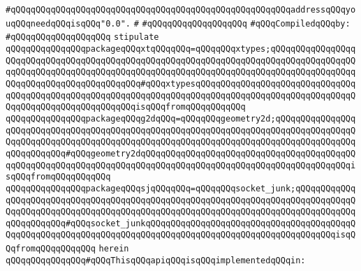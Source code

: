 \verb|#qQQqqQQqqQQqqQQqqQQqqQQqqQQqqQQqqQQqqQQqqQQqqQQqqQQqqQQqaddressqQQqyouqQQqneedqQQqisqQQq"0.0".|\newline
\verb|#|\newline
\verb|#qQQqqQQqqQQqqQQqqQQq|\newline
\newline
\verb|#qQQqCompiledqQQqby:|\newline
\verb|#qQQqqQQqqQQqqQQqqQQq|\newline
\newline
\newline
\newline
\verb|stipulate|\newline
\verb|qQQqqQQqqQQqqQQqpackageqQQqxtqQQqqQQq=qQQqqQQqxtypes;qQQqqQQqqQQqqQQqqQQqqQQqqQQqqQQqqQQqqQQqqQQqqQQqqQQqqQQqqQQqqQQqqQQqqQQqqQQqqQQqqQQqqQQqqQQqqQQqqQQqqQQqqQQqqQQqqQQqqQQqqQQqqQQqqQQqqQQqqQQqqQQqqQQqqQQqqQQqqQQqqQQqqQQqqQQqqQQqqQQqqQQq#qQQqxtypesqQQqqQQqqQQqqQQqqQQqqQQqqQQqqQQqqQQqqQQqqQQqqQQqqQQqqQQqqQQqqQQqqQQqqQQqqQQqqQQqqQQqqQQqqQQqqQQqqQQqqQQqqQQqqQQqqQQqqQQqqQQqqQQqisqQQqfromqQQqqQQqqQQq|\newline
\verb|qQQqqQQqqQQqqQQqpackageqQQqg2dqQQq=qQQqqQQqgeometry2d;qQQqqQQqqQQqqQQqqQQqqQQqqQQqqQQqqQQqqQQqqQQqqQQqqQQqqQQqqQQqqQQqqQQqqQQqqQQqqQQqqQQqqQQqqQQqqQQqqQQqqQQqqQQqqQQqqQQqqQQqqQQqqQQqqQQqqQQqqQQqqQQqqQQqqQQqqQQqqQQqqQQqqQQq#qQQqgeometry2dqQQqqQQqqQQqqQQqqQQqqQQqqQQqqQQqqQQqqQQqqQQqqQQqqQQqqQQqqQQqqQQqqQQqqQQqqQQqqQQqqQQqqQQqqQQqqQQqqQQqqQQqqQQqqQQqisqQQqfromqQQqqQQqqQQq|\newline
\verb|qQQqqQQqqQQqqQQqpackageqQQqsjqQQqqQQq=qQQqqQQqsocket_junk;qQQqqQQqqQQqqQQqqQQqqQQqqQQqqQQqqQQqqQQqqQQqqQQqqQQqqQQqqQQqqQQqqQQqqQQqqQQqqQQqqQQqqQQqqQQqqQQqqQQqqQQqqQQqqQQqqQQqqQQqqQQqqQQqqQQqqQQqqQQqqQQqqQQqqQQqqQQqqQQqqQQq#qQQqsocket_junkqQQqqQQqqQQqqQQqqQQqqQQqqQQqqQQqqQQqqQQqqQQqqQQqqQQqqQQqqQQqqQQqqQQqqQQqqQQqqQQqqQQqqQQqqQQqqQQqqQQqqQQqqQQqisqQQqfromqQQqqQQqqQQq|\newline
\verb|herein|\newline
\newline
\verb|qQQqqQQqqQQqqQQq#qQQqThisqQQqapiqQQqisqQQqimplementedqQQqin:|\newline
